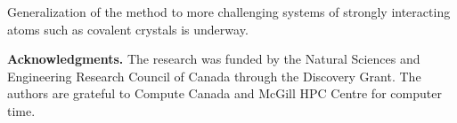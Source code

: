 \documentclass[aps,prl,reprint,amsmath,amssymb]{revtex4-1}
\begin{document}

Generalization of the method to more challenging systems of strongly interacting atoms such as covalent crystals is underway.

\textbf{Acknowledgments.} The research was funded by the Natural Sciences and Engineering Research Council of Canada through the Discovery Grant. The authors are grateful to Compute Canada and McGill HPC Centre for computer time.



\else

%
\end{document}
